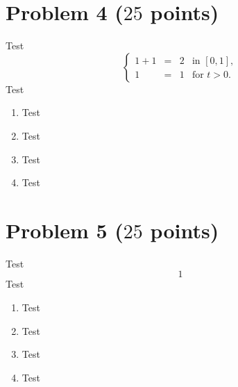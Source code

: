 \documentclass[a4paper]{article}%
\begin{document}
\section*{Problem 4 ($25$ points)} 
Test
\begin{equation*}
  \left\{
  \begin{array}{rcll}
    1         +  1 & = & 2   & \mbox{in } [0,1],   
    \\
    1                                  & = & 1   & \mbox{for } t > 0.
  \end{array}
  \right.
\end{equation*}
Test

\begin{enumerate}[label=(\alph*)]
  \item 
  Test
  \item
  Test
  \item 
  Test
  \item 
  Test
\end{enumerate}

\clearpage %

\clearpage %

\clearpage
{}\clearpage %








\section*{Problem 5 ($25$ points)} 
Test 
\begin{equation*}
  1
\end{equation*}
Test

\begin{enumerate}[label=(\alph*)]
  \item 
  Test
  \item
  Test
  \item 
  Test
  \item 
  Test
\end{enumerate}

\clearpage %

\clearpage %

\clearpage
{}\clearpage %
\end{document}
